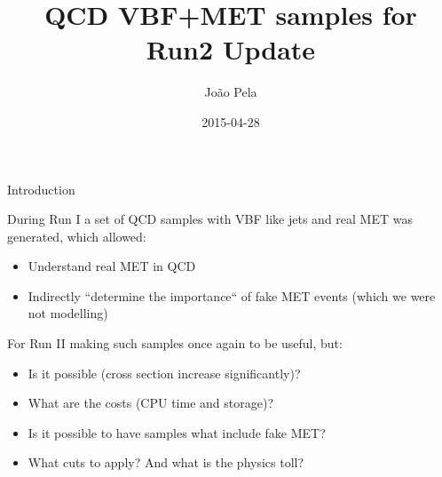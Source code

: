 \documentclass[8pt]{beamer}
\author[J. Pela]{João Pela}
\title{QCD VBF+MET samples for Run2 Update}
\institute[ICL]{Imperial College London}
\date{2015-04-28}
\begin{document}
\setlength{\unitlength}{1mm}

\begin{frame}
  \titlepage
\end{frame}

\begin{frame}{Introduction}

During Run I a set of QCD samples with VBF like jets and real MET was generated, which allowed:

\begin{block}
  
\begin{itemize}
  \item Understand real MET in QCD
  \item Indirectly ``determine the importance`` of fake MET events (which we were not modelling)
\end{itemize}

\end{block}

For Run II making such samples once again to be useful, but:

\begin{block}

\begin{itemize}
  \item Is it possible (cross section increase significantly)?
  \item What are the costs (CPU time and storage)?
  \item Is it possible to have samples what include fake MET?
  \item What cuts to apply? And what is the physics toll?
\end{itemize}
  
\end{block}

\end{frame}
\end{document}
